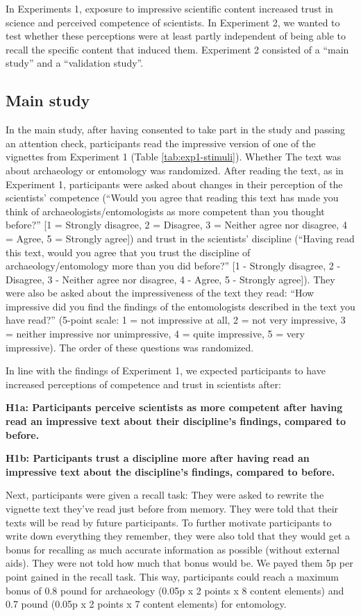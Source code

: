 \documentclass[
  doc,floatsintext]{apa6}
\begin{document}
In Experiments 1, exposure to impressive scientific content increased trust in science and perceived competence of scientists. In Experiment 2, we wanted to test whether these perceptions were at least partly independent of being able to recall the specific content that induced them. Experiment 2 consisted of a ``main study'' and a ``validation study''.

\subsection{Main study}\label{main-study}

In the main study, after having consented to take part in the study and passing an attention check, participants read the impressive version of one of the vignettes from Experiment 1 (Table \ref{tab:exp1-stimuli}). Whether The text was about archaeology or entomology was randomized. After reading the text, as in Experiment 1, participants were asked about changes in their perception of the scientists' competence (``Would you agree that reading this text has made you think of archaeologists/entomologists as more competent than you thought before?'' {[}1 = Strongly disagree, 2 = Disagree, 3 = Neither agree nor disagree, 4 = Agree, 5 = Strongly agree{]}) and trust in the scientists' discipline (``Having read this text, would you agree that you trust the discipline of archaeology/entomology more than you did before?'' {[}1 - Strongly disagree, 2 - Disagree, 3 - Neither agree nor disagree, 4 - Agree, 5 - Strongly agree{]}). They were also be asked about the impressiveness of the text they read: ``How impressive did you find the findings of the entomologists described in the text you have read?'' (5-point scale: 1 = not impressive at all, 2 = not very impressive, 3 = neither impressive nor unimpressive, 4 = quite impressive, 5 = very impressive). The order of these questions was randomized.

In line with the findings of Experiment 1, we expected participants to have increased perceptions of competence and trust in scientists after:

\textbf{H1a: Participants perceive scientists as more competent after having read an impressive text about their discipline's findings, compared to before.}

\textbf{H1b: Participants trust a discipline more after having read an impressive text about the discipline's findings, compared to before.}

Next, participants were given a recall task: They were asked to rewrite the vignette text they've read just before from memory. They were told that their texts will be read by future participants. To further motivate participants to write down everything they remember, they were also told that they would get a bonus for recalling as much accurate information as possible (without external aids). They were not told how much that bonus would be. We payed them 5p per point gained in the recall task. This way, participants could reach a maximum bonus of 0.8 pound for archaeology (0.05p x 2 points x 8 content elements) and 0.7 pound (0.05p x 2 points x 7 content elements) for entomology.
\end{document}
